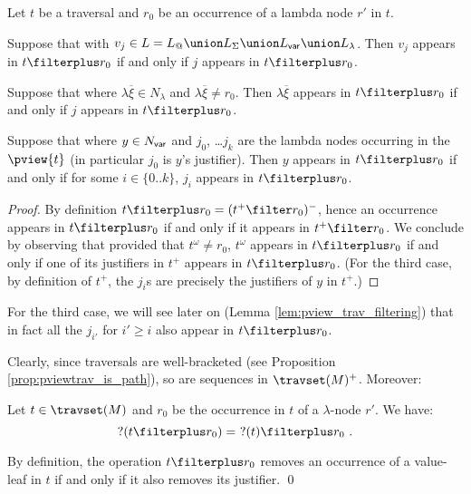 \begin{lemma}
\label{lem:ifin_tfilterplus_so_does_justifier}
Let $t$ be a traversal
and  $r_0$ be an occurrence of a lambda node $r'$ in $t$.
\begin{compactitem}
  \item Suppose that  with $v_j \in L = L_@ \union L_\Sigma \union L_{\sf var} \union L_\lambda$.
      Then $v_j$ appears in $t\filterplus r_0$ if and only if
      $j$ appears in $t\filterplus r_0$.
  \item Suppose that  where $\lambda \overline{\xi} \in N_\lambda$
          and $\lambda \overline{\xi} \neq r_0$.
          Then $\lambda \overline{\xi}$ appears in $t\filterplus r_0$ if and only if $j$ appears in $t\filterplus r_0$.

  \item Suppose that  where $y\in N_{\sf var}$ and $j_0$, \ldots $j_k$ are the lambda nodes occurring in the $\pview{t}$ (in particular $j_0$ is $y$'s justifier). Then $y$ appears in $t\filterplus r_0$ if and only if for some $i \in \{0..k\}$, $j_i$ appears in $t\filterplus r_0$.
\end{compactitem}
\end{lemma}
\begin{proof}
By definition $t\filterplus r_0 = (t^+ \filter r_0)^-$, hence
an occurrence appears in $t\filterplus r_0$ if and only if it
appears in $t^+ \filter r_0$. We conclude by observing that provided that $t^\omega \neq r_0$, $t^\omega$ appears in $t\filterplus r_0$ if and only if one of its justifiers in $t^+$ appears in $t\filterplus r_0$. (For the third case, by definition of $t^+$, the $j_i$s are precisely the justifiers of $y$ in $t^+$.)
\end{proof}
For the third case, we will see later on (Lemma \ref{lem:pview_trav_filtering}) that in fact all the $j_{i'}$ for $i' \geq i$ also appear in $t\filterplus r_0$.
\bigskip

Clearly, since traversals are well-bracketed (see Proposition \ref{prop:pviewtrav_is_path}), so are sequences in $\travset(M)^+$. Moreover:
\begin{lemma}
\label{lem:filterplus_pendingnode}
 Let $t \in \travset(M)$ and $r_0$ be the occurrence in $t$ of a $\lambda$-node $r'$.
 We have:
  $$?(t\filterplus r_0) =\ ?(t) \filterplus r_0 \ .$$
\end{lemma}
\proof
 By definition, the operation $t \filterplus r_0$ removes an occurrence of a value-leaf in $t$
if and only if it also removes its justifier. \qed


